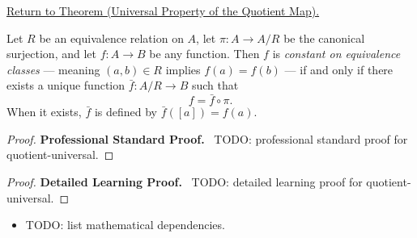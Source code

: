 \newpage
{}
\label{prf:quotient-universal}

\begin{remark*}[Return]
\hyperref[thm:quotient-universal]{Return to Theorem (Universal Property of the Quotient Map).}
\end{remark*}

\begin{theorem*}
Let $R$ be an equivalence relation on $A$, let $\pi : A \to A/R$ be the
canonical surjection, and let $f : A \to B$ be any function. Then $f$ is
\emph{constant on equivalence classes} — meaning $(a,b) \in R$ implies
$f(a) = f(b)$ — if and only if there exists a unique function
$\bar{f} : A/R \to B$ such that
\[
f = \bar{f} \circ \pi.
\]
When it exists, $\bar{f}$ is defined by $\bar{f}([a]) = f(a)$.
\end{theorem*}

\begin{proof}
\textbf{Professional Standard Proof.}~
TODO: professional standard proof for quotient-universal.
\end{proof}

\begin{proof}
\textbf{Detailed Learning Proof.}~
TODO: detailed learning proof for quotient-universal.
\end{proof}

\begin{remark*}
\end{remark*}

\begin{dependencies}
\begin{itemize}
  \item TODO: list mathematical dependencies.
\end{itemize}
\end{dependencies}

\clearpage
